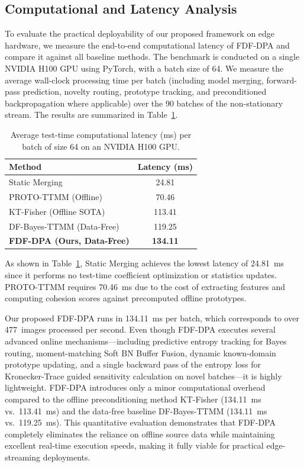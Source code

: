 \documentclass{article}
\theoremstyle{plain}
\theoremstyle{definition}
\theoremstyle{remark}
\begin{document}
\subsection{Computational and Latency Analysis}
To evaluate the practical deployability of our proposed framework on edge hardware, we measure the end-to-end computational latency of FDF-DPA and compare it against all baseline methods. The benchmark is conducted on a single NVIDIA H100 GPU using PyTorch, with a batch size of 64. We measure the average wall-clock processing time per batch (including model merging, forward-pass prediction, novelty routing, prototype tracking, and preconditioned backpropagation where applicable) over the 90 batches of the non-stationary stream. The results are summarized in Table~\ref{tab:latency}.

\begin{table}[h]
\centering
\caption{Average test-time computational latency (ms) per batch of size 64 on an NVIDIA H100 GPU.}
\label{tab:latency}
\vskip 0.15in
\setlength{\tabcolsep}{4pt}
\footnotesize
\begin{tabular}{lc}
\toprule
\textbf{Method} & \textbf{Latency (ms)} \\
\midrule
Static Merging & 24.81 \\
PROTO-TTMM (Offline) & 70.46 \\
KT-Fisher (Offline SOTA) & 113.41 \\
DF-Bayes-TTMM (Data-Free) & 119.25 \\
\midrule
\textbf{FDF-DPA (Ours, Data-Free)} & \textbf{134.11} \\
\bottomrule
\end{tabular}
\end{table}

As shown in Table~\ref{tab:latency}, Static Merging achieves the lowest latency of 24.81~ms since it performs no test-time coefficient optimization or statistics updates. PROTO-TTMM requires 70.46~ms due to the cost of extracting features and computing cohesion scores against precomputed offline prototypes.

Our proposed FDF-DPA runs in 134.11~ms per batch, which corresponds to over 477~images processed per second. Even though FDF-DPA executes several advanced online mechanisms---including predictive entropy tracking for Bayes routing, moment-matching Soft BN Buffer Fusion, dynamic known-domain prototype updating, and a single backward pass of the entropy loss for Kronecker-Trace guided sensitivity calculation on novel batches---it is highly lightweight. FDF-DPA introduces only a minor computational overhead compared to the offline preconditioning method KT-Fisher (134.11~ms vs.\ 113.41~ms) and the data-free baseline DF-Bayes-TTMM (134.11~ms vs.\ 119.25~ms). This quantitative evaluation demonstrates that FDF-DPA completely eliminates the reliance on offline source data while maintaining excellent real-time execution speeds, making it fully viable for practical edge-streaming deployments.
\end{document}
